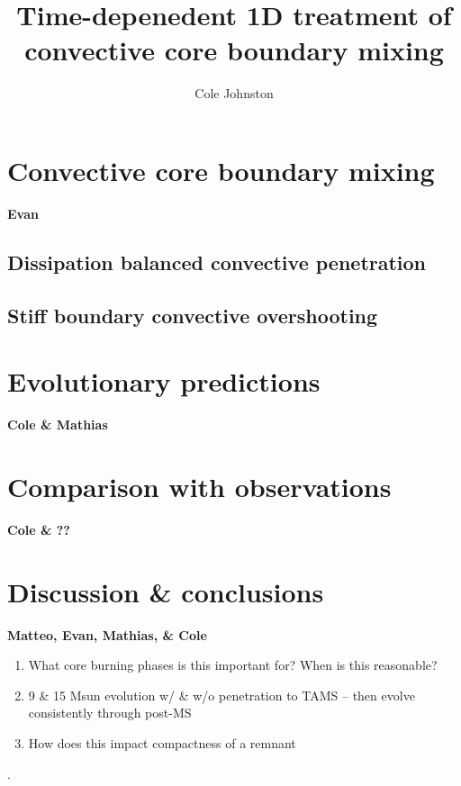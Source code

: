 \documentclass[twocolumn]{aastex631}
\begin{document}
\title{Time-depenedent 1D treatment of convective core boundary mixing}

\author[0000-0002-0786-7307]{Cole Johnston}

\begin{abstract}

\end{abstract}

\section{Convective core boundary mixing}
{\bf Evan}
\subsection{Dissipation balanced convective penetration}

\subsection{Stiff boundary convective overshooting}

\section{Evolutionary predictions}
{\bf Cole \& Mathias}

\section{Comparison with observations}
{\bf Cole \& ??}

\section{Discussion \& conclusions}
{\bf Matteo, Evan, Mathias, \& Cole}

\begin{enumerate}
    \item What core burning phases is this important for? When is this reasonable?
    \item 9 \& 15 Msun evolution w/ \& w/o penetration to TAMS -- then evolve consistently through post-MS
    \item How does this impact compactness of a remnant
\end{enumerate}

\citep{Luger2021}.


\end{document}
